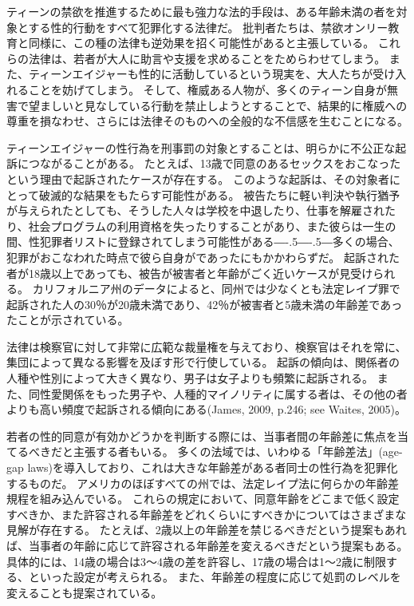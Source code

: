 \documentclass[paper=a4,book,openany]{jlreq}
\def\DDASH{―\kern-.5\zw―\kern-.5\zw―}
\begin{document}
ティーンの禁欲を推進するために最も強力な法的手段は、ある年齢未満の者を対象とする性的行動をすべて犯罪化する法律だ。
批判者たちは、禁欲オンリー教育と同様に、この種の法律も逆効果を招く可能性があると主張している。
これらの法律は、若者が大人に助言や支援を求めることをためらわせてしまう。
また、ティーンエイジャーも性的に活動しているという現実を、大人たちが受け入れることを妨げてしまう。
そして、権威ある人物が、多くのティーン自身が無害で望ましいと見なしている行動を禁止しようとすることで、結果的に権威への尊重を損なわせ、さらには法律そのものへの全般的な不信感を生むことになる。

ティーンエイジャーの性行為を刑事罰の対象とすることは、明らかに不公正な起訴につながることがある。
たとえば、13歳で同意のあるセックスをおこなったという理由で起訴されたケースが存在する。
このような起訴は、その対象者にとって破滅的な結果をもたらす可能性がある。
被告たちに軽い判決や執行猶予が与えられたとしても、そうした人々は学校を中退したり、仕事を解雇されたり、社会プログラムの利用資格を失ったりすることがあり、また彼らは一生の間、性犯罪者リストに登録されてしまう可能性がある{\DDASH}多くの場合、犯罪がおこなわれた時点で彼ら自身がであったにもかかわらずだ。
起訴された者が18歳以上であっても、被告が被害者と年齢がごく近いケースが見受けられる。
カリフォルニア州のデータによると、同州では少なくとも法定レイプ罪で起訴された人の30％が20歳未満であり、42％が被害者と5歳未満の年齢差であったことが示されている\citep[pp. 51--52]{ccasa2008}。

法律は検察官に対して非常に広範な裁量権を与えており、検察官はそれを常に、集団によって異なる影響を及ぼす形で行使している。
起訴の傾向は、関係者の人種や性別によって大きく異なり、男子は女子よりも頻繁に起訴される。
また、同性愛関係をもった男子や、人種的マイノリティに属する者は、その他の者よりも高い頻度で起訴される傾向にある(James, 2009, p.246; see Waites, 2005)。
\nocite{james09:_romeo_juliet_were_sex_offen}\nocite{waites04:_age_consen_sexual_consen}

若者の性的同意が有効かどうかを判断する際には、当事者間の年齢差に焦点を当てるべきだと主張する者もいる。
多くの法域では、いわゆる「年齢差法」(age-gap laws)を導入しており、これは大きな年齢差がある者同士の性行為を犯罪化するものだ。
アメリカのほぼすべての州では、法定レイプ法に何らかの年齢差規程を組み込んでいる。
これらの規定において、同意年齢をどこまで低く設定すべきか、また許容される年齢差をどれくらいにすべきかについてはさまざまな見解が存在する。
たとえば、2歳以上の年齢差を禁じるべきだという提案もあれば\citep{waites04:_age_consen_sexual_consen}、当事者の年齢に応じて許容される年齢差を変えるべきだという提案もある。
具体的には、14歳の場合は3～4歳の差を許容し、17歳の場合は1～2歳に制限する、といった設定が考えられる。
また、年齢差の程度に応じて処罰のレベルを変えることも提案されている。
\end{document}
